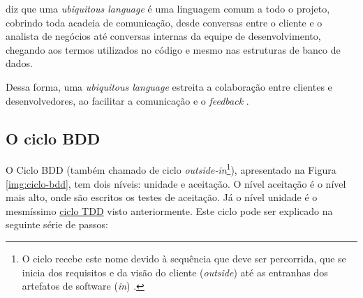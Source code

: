  diz que uma \textit{ubiquitous language} é uma linguagem comum a todo o projeto, cobrindo toda acadeia de comunicação, desde conversas entre o cliente e o analista de negócios até conversas internas da equipe de desenvolvimento, chegando aos termos utilizados no código e mesmo nas estruturas de banco de dados.

Dessa forma, uma \textit{ubiquitous language} estreita a colaboração entre clientes e desenvolvedores, ao facilitar a comunicação e o \textit{feedback} \cite{DDD}.


\subsection{O ciclo BDD}
\label{sub:o_ciclo_bdd}

O Ciclo BDD (também chamado de ciclo \textit{outside-in}\footnote{O ciclo recebe este nome devido à sequência que deve ser percorrida, que se inicia dos requisitos e da visão do cliente (\textit{outside}) até as entranhas dos artefatos de software (\textit{in}) \cite{BDDRodrigo}.}), apresentado na Figura \ref{img:ciclo-bdd}, tem dois níveis: unidade e aceitação. O nível aceitação é o nível mais alto, onde são escritos os testes de aceitação. Já o nível unidade é o mesmíssimo \hyperref[ssub:ciclo_tdd]{ciclo TDD} visto anteriormente. Este ciclo pode ser explicado na seguinte série de passos:

